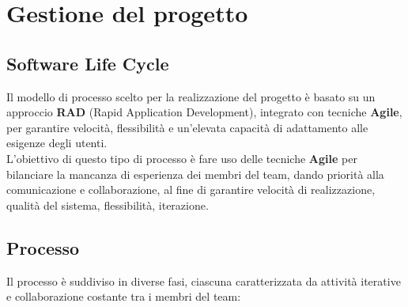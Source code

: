 \documentclass[a4paper,12pt]{article}
\begin{document}
\section{Gestione del progetto}
\subsection{Software Life Cycle}

Il modello di processo scelto per la realizzazione del progetto è basato su un approccio \textbf{RAD} (Rapid Application Development), integrato con tecniche \textbf{Agile}, per garantire velocità, flessibilità e un'elevata capacità di adattamento alle esigenze degli utenti.\\
L’obiettivo di questo tipo di processo è fare uso delle tecniche \textbf{Agile} per bilanciare la mancanza di esperienza dei membri del team, dando priorità alla comunicazione e collaborazione, al fine di garantire velocità di realizzazione, qualità del sistema, flessibilità, iterazione.
\subsection{Processo}

Il processo è suddiviso in diverse fasi, ciascuna caratterizzata da attività iterative e collaborazione costante tra i membri del team:
\end{document}
